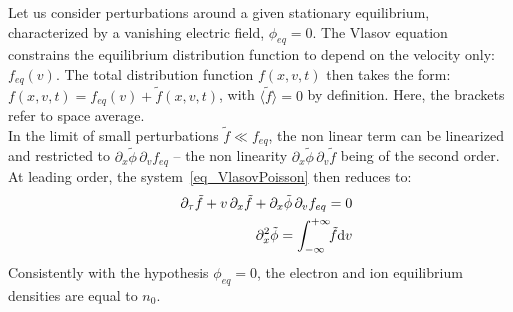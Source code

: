\documentclass[11pt]{article}
\newcommand{\dd}{\textrm d}
\begin{document}
Let us consider perturbations around a given stationary
equilibrium, characterized by a vanishing electric field,
$\phi_{eq}=0$. The Vlasov equation constrains the equilibrium distribution
function to depend on the velocity only: $f_{eq}(v)$. The total
distribution function $f(x,v,t)$ then takes the form: $f(x,v,t) =
f_{eq}(v) + \tilde f(x,v,t)$, with $\langle \tilde f \rangle = 0$
by definition. Here, the brackets refer to space average. \\

In the limit of small perturbations $\tilde f\ll f_{eq}$, the non
linear term can be linearized and restricted to $\partial_x
\tilde\phi \,\partial_v f_{eq}$ -- the non linearity $\partial_x
\tilde\phi \,\partial_v \tilde f$ being of the second order. At
leading order, the system~\eqref{eq_VlasovPoisson} then reduces to:
\begin{eqnarray}\label{eq_VlasovPoisson_lin}
&& \partial_{\tau}\tilde f +
  v\,\partial_{x} \tilde f +
  \partial_{x}\tilde\phi \,\partial_{v}f_{eq} = 0 \\
&& \partial^{2}_{x}\tilde \phi
   = \int_{-\infty}^{+\infty}\!\! \tilde f \dd v \nonumber
\end{eqnarray}
Consistently with the hypothesis $\phi_{eq}=0$, the electron and
ion equilibrium densities are equal to $n_0$.\\
\end{document}
